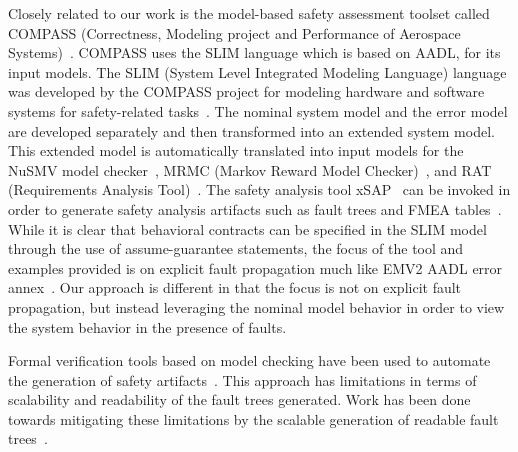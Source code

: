 Closely related to our work is the model-based safety assessment toolset called COMPASS (Correctness, Modeling project and Performance of Aerospace Systems)~\cite{10.1007/978-3-642-04468-7_15}. COMPASS uses the SLIM language which is based on AADL, for its input models. The SLIM (System Level Integrated Modeling Language) language was developed by the COMPASS project for modeling hardware and software systems for safety-related tasks~\cite{5185388, criticalembeddedsystems}. The nominal system model and the error model are developed separately and then transformed into an extended system model. This extended model is automatically translated into input models for the NuSMV model checker~\cite{Cimatti2000, NuSMV}, MRMC (Markov Reward Model Checker)~\cite{Katoen:2005:MRM:1114692.1115230, MRMC}, and RAT (Requirements Analysis Tool)~\cite{RAT}. The safety analysis tool xSAP~\cite{DBLP:conf/tacas/BittnerBCCGGMMZ16} can be invoked in order to generate safety analysis artifacts such as fault trees and FMEA tables~\cite{compass30toolset}. While it is clear that behavioral contracts can be specified in the SLIM model through the use of assume-guarantee statements, the focus of the tool and examples provided is on explicit fault propagation much like EMV2 AADL error annex~\cite{COMPASSusersguide}. Our approach is different in that the focus is not on explicit fault propagation, but instead leveraging the nominal model behavior in order to view the system behavior in the presence of faults. 

Formal verification tools based on model checking have been used to automate the generation of safety artifacts~\cite{symbAltaRica,10.1007/978-3-540-75596-8-13, DBLP:conf/tacas/BittnerBCCGGMMZ16}. This approach has limitations in terms of scalability and readability of the fault trees generated. Work has been done towards mitigating these limitations by the scalable generation of readable fault trees~\cite{10.1007/978-3-319-11936-6-7}.

